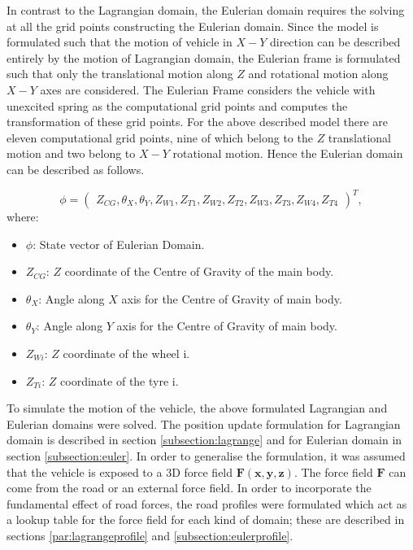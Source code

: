 \noindent In contrast to the Lagrangian domain, the Eulerian domain requires the solving at all the grid points constructing the Eulerian domain. Since the model is formulated such that the motion of vehicle in $X-Y$ direction can be described entirely by the motion of Lagrangian domain, the Eulerian frame is formulated such that only the translational motion along $Z$ and rotational motion along $X-Y$ axes are considered. The Eulerian Frame considers the vehicle with unexcited spring as the computational grid points and computes the transformation of these grid points. For the above described model there are eleven computational grid points, nine of which belong to the $Z$ translational motion and two belong to $X-Y$ rotational motion. Hence the Eulerian domain can be described as follows.

\begin{equation}
     \phi = \begin{pmatrix} 
                        Z_{CG}, 
                        \theta_{X},
                        \theta_{Y},
                        Z_{W1},
                        Z_{T1},
                        Z_{W2},
                        Z_{T2},
                        Z_{W3},
                        Z_{T3},
                        Z_{W4},
                        Z_{T4}
                        \end{pmatrix}^{T},
\end{equation}
where: 
\begin{itemize}
    \item $\phi$: State vector of Eulerian Domain.
    \item $Z_{CG}$: $Z$ coordinate of the Centre of Gravity of the main body.
    \item $\theta_{X}$: Angle along $X$ axis for the Centre of Gravity of main body.
    \item $\theta_{Y}$: Angle along $Y$ axis for the Centre of Gravity of main body.
    \item $Z_{Wi}$: $Z$ coordinate of the wheel i.
    \item $Z_{Ti}$: $Z$ coordinate of the tyre i.
\end{itemize}

\noindent To simulate the motion of the vehicle, the above formulated Lagrangian and Eulerian domains were solved. The position update formulation for Lagrangian domain is described in section \ref{subsection:lagrange} and for Eulerian domain in section \ref{subsection:euler}. In order to generalise the formulation, it was assumed that the vehicle is exposed to a 3D force field $\mathbf{F(x, y, z)}$. The force field $\mathbf{F}$ can come from the road or an external force field. In order to incorporate the fundamental effect of road forces, the road profiles were formulated which act as a lookup table for the force field for each kind of domain; these are described in sections \ref{par:lagrangeprofile} and \ref{subsection:eulerprofile}.


